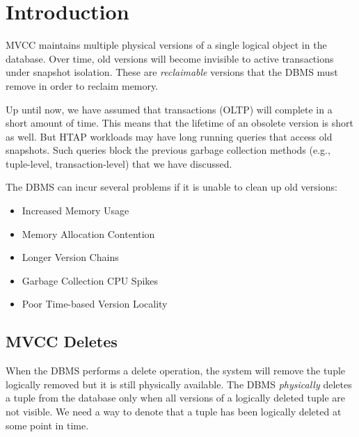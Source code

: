 \documentclass[11pt]{article}
\begin{document}
\maketitle
\thispagestyle{plain}

\section{Introduction}
MVCC maintains multiple physical versions of a single logical object in the database. Over time, old 
versions will become invisible to active transactions under snapshot isolation. These 
are \textit{reclaimable} versions that the DBMS must remove in order to reclaim memory.

Up until now, we have assumed that transactions (OLTP) will complete in a short amount of time. This 
means that the lifetime of an obsolete version is short as well. But HTAP workloads may have long 
running queries that access old snapshots. Such queries block the previous garbage collection 
methods (e.g., tuple-level, transaction-level) that we have discussed. 

The DBMS can incur several problems if it is unable to clean up old versions:
\begin{itemize}
    \item Increased Memory Usage
    \item Memory Allocation Contention
    \item Longer Version Chains
    \item Garbage Collection CPU Spikes
    \item Poor Time-based Version Locality
\end{itemize}

\subsection*{MVCC Deletes}
When the DBMS performs a delete operation, the system will remove the tuple logically removed but 
it is still physically available.
The DBMS \textit{physically} deletes a tuple from the database only when all versions of a 
logically deleted tuple are not visible. We need a way to denote that a tuple has been logically 
deleted at some point in time.
\end{document}
